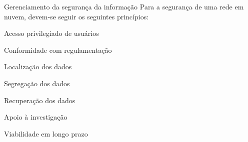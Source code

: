 \begin{frame}{Gerenciamento da segurança da informação}
    Para a segurança de uma rede em nuvem, devem-se seguir os seguintes princípios:
    \begin{itemise}
        \item<2-> Acesso privilegiado de usuários
        \item<3-> Conformidade com regulamentação
        \item<4-> Localização dos dados
        \item<5-> Segregação dos dados
        \item<6-> Recuperação dos dados
        \item<7-> Apoio à investigação
        \item<8-> Viabilidade em longo prazo
    \end{itemise}
\end{frame}
